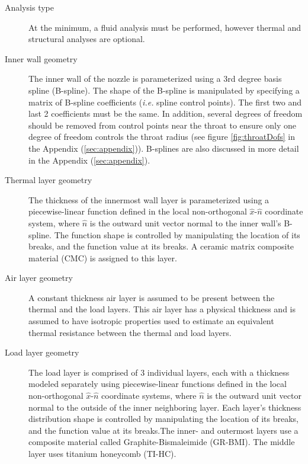 \documentclass{article}
\begin{document}
\begin{description}
\item[Analysis type] At the minimum, a fluid analysis must be performed, however thermal and structural analyses are optional.

\item[Inner wall geometry] The inner wall of the nozzle is parameterized using a 3rd degree basis spline (B-spline). The shape of the B-spline is manipulated by specifying a matrix of B-spline coefficients (\textit{i.e.} spline control points). The first two and last 2 coefficients must be the same. In addition, several degrees of freedom should be removed from control points near the throat to ensure only one degree of freedom controls the throat radius (see figure \ref{fig:throatDofs} in the Appendix (\ref{sec:appendix})). B-splines are also discussed in more detail in the Appendix (\ref{sec:appendix}).

\item[Thermal layer geometry] The thickness of the innermost wall layer is parameterized using a piecewise-linear function defined in the local non-orthogonal $\hat{x}$-$\hat{n}$ coordinate system, where $\hat{n}$ is the outward unit vector normal to the inner wall's B-spline. The function shape is controlled by manipulating the location of its breaks, and the function value at its breaks. A ceramic matrix composite material (CMC) is assigned to this layer.

\item[Air layer geometry] A constant thickness air layer is assumed to be present between the thermal and the load layers. This air layer has a physical thickness and is assumed to have isotropic properties used to estimate an equivalent thermal resistance between the thermal and load layers.

\item[Load layer geometry] The load layer is comprised of 3 individual layers, each with a thickness modeled separately using piecewise-linear functions defined in the local non-orthogonal $\hat{x}$-$\hat{n}$ coordinate systems, where $\hat{n}$ is the outward unit vector normal to the outside of the inner neighboring layer. Each layer's thickness distribution shape is controlled by manipulating the location of its breaks, and the function value at its breaks.The inner- and outermost layers use a composite material called Graphite-Bismaleimide (GR-BMI). The middle layer uses titanium honeycomb (TI-HC).


\end{description}
\end{document}
